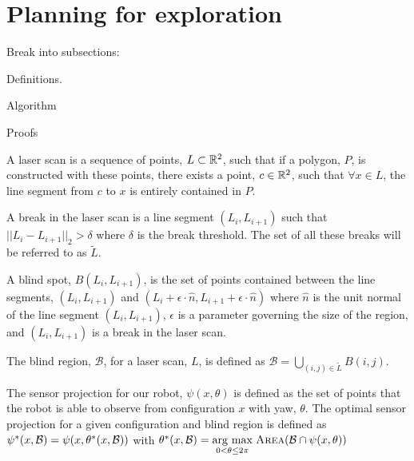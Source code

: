 
\section{Planning for exploration}

Break into subsections:

Definitions.

Algorithm

Proofs


\begin{definition}

    A laser scan is a sequence of points, $L \subset \mathbb{R}^2$, such that
    if a polygon, $P$, is constructed with these points, there exists a point,
    $c \in \mathbb{R}^2$, such that $\forall x \in L$, the line segment from
    $c$ to $x$ is entirely contained in $P$.

\end{definition}

\begin{definition}

    A break in the laser scan is a line segment $(L_i, L_{i + 1})$ such that
    $||L_i - L_{i + 1}||_2 > \delta$ where $\delta$ is the break threshold. The
    set of all these breaks will be referred to as $\tilde L$.

\end{definition}

\begin{definition}

    A blind spot, $B(L_i, L_{i + 1})$, is the set of points contained between
    the line segments, $(L_i, L_{i + 1})$ and $(L_i + \epsilon \cdot \hat n,
    L_{i + 1} + \epsilon \cdot \hat n)$ where $\hat n$ is the unit normal of
    the line segment $(L_i, L_{i + 1})$, $\epsilon$ is a parameter governing
    the size of the region, and $(L_i, L_{i + 1})$ is a break in the laser
    scan.

\end{definition}

\begin{definition}

    The blind region, $\mathcal{B}$, for a laser scan, $L$, is defined as
    $\mathcal{B} = \bigcup_{(i, j) \in \tilde L} B(i, j)$.

\end{definition}

\begin{definition}

    The sensor projection for our robot, $\psi(x, \theta)$ is defined as the
    set of points that the robot is able to observe from configuration $x$ with
    yaw, $\theta$. The optimal sensor projection for a given configuration and
    blind region is defined as $\psi^*(x, {{\mathcal{B}}}) = \psi(x, \theta^*(x, {{\mathcal{B}}}))$ with
    $\theta^*(x, {{\mathcal{B}}}) = \underset{0 < \theta \leq 2\pi}{\operatorname{arg}\,\operatorname{max}}\; {\textsc{Area}}({{\mathcal{B}}} \cap \psi(x,
    \theta))$

\end{definition}

